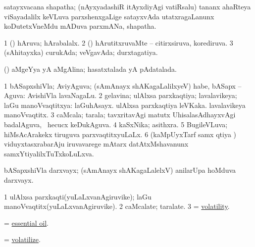 \bentry 
{} 
\gl{\nA}
\expl{\F\ }
\bmng
satayxvacana shapatha; (nAyxyadashiR itAyxdiyAgi vatiRsalu) tananx ahaRteya viSayadalilx keVLuva parxshenxgaLige satayxvAda utatxragaLanunx koDutetxVneMdu mADuva parxmANa, shapatha. 
\emng
\eentry

\bentry 
{}
\gl{\saMkiSx}
\expl{}
\bmng
\emng
\eentry

\bentry 
{} 
\gl{\gu}
\expl{}
\bmng
\bnum
\num{1} (\pArxvi) hAruva; hArabalalx. 
\num{2} (\vaMlAM) hArutitxruvaMte -- citirxsiruva, korediruva. 
\num{3} (sAhitayxka) curukAda; veVgavAda; durxtagatiya. 
\enum
\emng
\eentry

\bentry
{} 
\gl{\gu}
\expl{}
\bmng
 (\aMrashA) aMgeYya yA aMgAlina; hasatxtalada yA pAdatalada. 
\emng
\eentry

\bentry 
{} 
\gl{\gu}
\expl{}
\bmng
\bnum
\num{1} bASapxshiVla; AviyAguva; (sAmAnayx shAKagaLalilxyeV) habe, bASapx -- Aguva:  AvishiVla lavaNagaLu. 
\num{2} gelavina; ulAlxsa parxkaqtiya; lavalavikeya; laGu manoVvaqtitxya:  laGuhAsayx.  ulAlxsa parxkaqtiya leVKaka.  lavalavikeya manoVvaqtitx. 
\num{3} caMcala; tarala; tavxritavAgi matutx UhisalasAdhayxvAgi badalAguva, \kanmu\ hecucx keDukAguva. 
\num{4} kaSxNika; asithxra. 
\num{5} BugileVLuva; hiMsAcArakekx tiruguva parxvaqtitxyuLaLx. 
\num{6} (kaMpUyxTarf samx qtiya \vi) viduyxtasxrabarAju iruvavarege mAtarx datAtxMshavanunx samxYtiyalilxTuTxkoLuLxva. 
\enum
\emng
\eentry

\bentry
{} 
\gl{\nA}
\expl{}
\bmng
 bASapxshiVla darxvayx; (sAmAnayx shAKagaLalelxV) anilarUpa hoMduva darxvayx. 
\emng
\eentry

\bentry
{} 
\gl{\nA}
\expl{}
\bmng
\bnum
\num{1} ulAlxsa parxkaqti(yuLaLxvanAgiruvike); laGu manoVvaqtitx(yuLaLxvanAgiruvike). 
\num{2} caMcalate; taralate. 
\num{3} = \hyperlink{volatility}{volatility}. 
\enum
\emng
\eentry

\bentry 
{} 
\gl{\nA}
\expl{}
\bmng
 = \hyperref{kandict_e.pdf}{E}{essential oil}{essential oil}. 
\emng
\eentry

\bentry
{} 
\gl{\kirx}
\expl{}
\bmng
 = \hyperlink{volatilize}{volatilize}. 
\emng
\eentry

